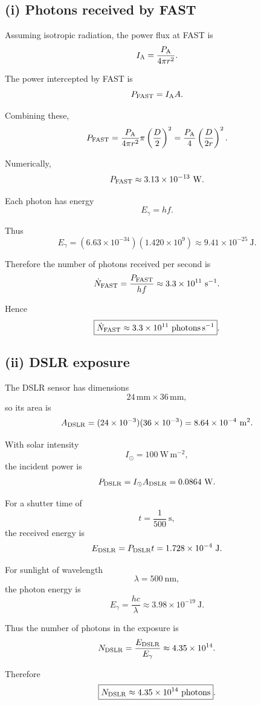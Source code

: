 \documentclass[11pt,a4paper]{article}
\begin{document}
\subsection{(i) Photons received by FAST}

Assuming isotropic radiation, the power flux at FAST is
\[
I_{\rm A}
=
\frac{P_{\rm A}}{4\pi r^2}.
\]

The power intercepted by FAST is
\[
P_{\rm FAST}
=
I_{\rm A}A.
\]

Combining these,
\[
P_{\rm FAST}
=
\frac{P_{\rm A}}{4\pi r^2}
\pi\left(\frac D2\right)^2
=
\frac{P_{\rm A}}{4}
\left(\frac{D}{2r}\right)^2.
\]

Numerically,
\[
P_{\rm FAST}\approx3.13\times10^{-13}\ \mathrm W.
\]

Each photon has energy
\[
E_\gamma=hf.
\]

Thus
\[
E_\gamma
=
(6.63\times10^{-34})(1.420\times10^9)
\approx9.41\times10^{-25}\ \mathrm J.
\]

Therefore the number of photons received per second is
\[
\dot N_{\rm FAST}
=
\frac{P_{\rm FAST}}{hf}
\approx3.3\times10^{11}\ \mathrm{s^{-1}}.
\]

Hence
\[
\boxed{\dot N_{\rm FAST}\approx3.3\times10^{11}\ \mathrm{photons\,s^{-1}}}.
\]

\subsection{(ii) DSLR exposure}

The DSLR sensor has dimensions
\[
24\,\mathrm{mm}\times36\,\mathrm{mm},
\]
so its area is
\[
A_{\rm DSLR}
=
(24\times10^{-3})(36\times10^{-3})
=
8.64\times10^{-4}\ \mathrm{m^2}.
\]

With solar intensity
\[
I_\odot=100\ \mathrm{W\,m^{-2}},
\]
the incident power is
\[
P_{\rm DSLR}
=
I_\odot A_{\rm DSLR}
=
0.0864\ \mathrm W.
\]

For a shutter time of
\[
t=\frac1{500}\ \mathrm s,
\]
the received energy is
\[
E_{\rm DSLR}
=
P_{\rm DSLR}t
=
1.728\times10^{-4}\ \mathrm J.
\]

For sunlight of wavelength
\[
\lambda=500\ \mathrm{nm},
\]
the photon energy is
\[
E_\gamma
=
\frac{hc}{\lambda}
\approx3.98\times10^{-19}\ \mathrm J.
\]

Thus the number of photons in the exposure is
\[
N_{\rm DSLR}
=
\frac{E_{\rm DSLR}}{E_\gamma}
\approx4.35\times10^{14}.
\]

Therefore
\[
\boxed{N_{\rm DSLR}\approx4.35\times10^{14}\ \mathrm{photons}}.
\]
\end{document}
